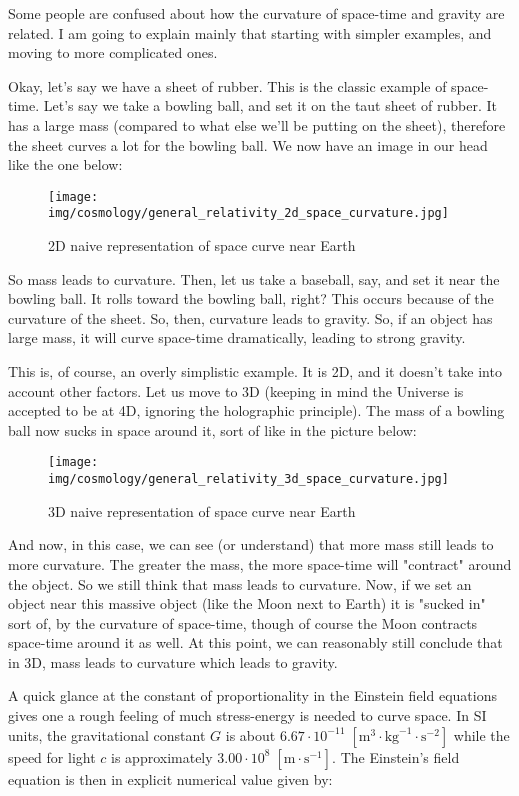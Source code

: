 	Some people are confused about how the curvature of space-time and gravity are related. I am going to explain mainly that starting with simpler examples, and moving to more complicated ones.

	Okay, let's say we have a sheet of rubber. This is the classic example of space-time. Let's say we take a bowling ball, and set it on the taut sheet of rubber. It has a large mass (compared to what else we'll be putting on the sheet), therefore the sheet curves a lot for the bowling ball. We now have an image in our head like the one below:
	\begin{figure}[H]
		\centering
		\texttt{[image: img/cosmology/general\_relativity\_2d\_space\_curvature.jpg]}	
		\caption{2D naive representation of space curve near Earth}
	\end{figure}
	So mass leads to curvature. Then, let us take a baseball, say, and set it near the bowling ball. It rolls toward the bowling ball, right? This occurs because of the curvature of the sheet. So, then, curvature leads to gravity. So, if an object has large mass, it will curve space-time dramatically, leading to strong gravity.

	This is, of course, an overly simplistic example. It is 2D, and it doesn't take into account other factors. Let us move to 3D (keeping in mind the Universe is accepted to be at 4D, ignoring the holographic principle). The mass of a bowling ball now sucks in space around it, sort of like in the picture below:
	\begin{figure}[H]
		\centering
		\texttt{[image: img/cosmology/general\_relativity\_3d\_space\_curvature.jpg]}	
		\caption{3D naive representation of space curve near Earth}
	\end{figure}
	And now, in this case, we can see (or understand) that more mass still leads to more curvature. The greater the mass, the more space-time will "contract" around the object. So we still think that mass leads to curvature. Now, if we set an object near this massive object (like the Moon next to Earth) it is "sucked in" sort of, by the curvature of space-time, though of course the Moon contracts space-time around it as well. At this point, we can reasonably still conclude that in 3D, mass leads to curvature which leads to gravity.
	
	A quick glance at the constant of proportionality in the Einstein field equations gives one a rough feeling of much stress-energy is needed to curve space. In SI units, the gravitational constant $G$ is about $6.67\cdot 10^{-11}\;[\text{m}^3\cdot\text{kg}^{-1}\cdot\text{s}^{-2}]$ while the speed for light $c$ is approximately $3.00\cdot 10^8\;[\text{m}\cdot \text{s}^{-1}]$. The Einstein's field equation is then in explicit numerical value given by:
	
